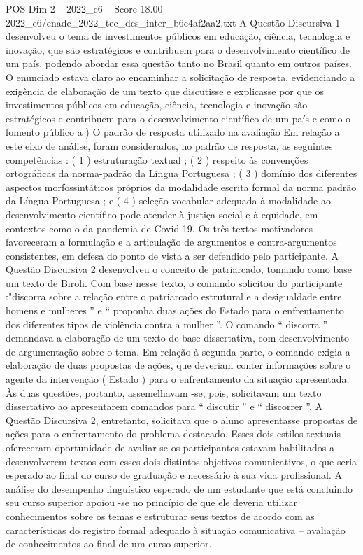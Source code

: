 \begin{textsample}{POS Dim 2 – 2022\_c6 – Score 18.00 – 2022\_c6/enade\_2022\_tec\_des\_inter\_b6c4af2aa2.txt}
A Questão Discursiva 1 desenvolveu o tema de investimentos públicos em educação, ciência, tecnologia e inovação, que são estratégicos e contribuem para o desenvolvimento científico de um país, podendo abordar essa questão tanto no Brasil quanto em outros países.
O enunciado estava claro ao encaminhar a solicitação de resposta, evidenciando a exigência de elaboração de um texto que discutisse e explicasse por que os investimentos públicos em educação, ciência, tecnologia e inovação são estratégicos e contribuem para o desenvolvimento científico de um país e como o fomento público a ) O padrão de resposta utilizado na avaliação Em relação a este eixo de análise, foram considerados, no padrão de resposta, as seguintes competências : ( 1 ) estruturação textual ; ( 2 ) respeito às convenções ortográficas da norma-padrão da Língua Portuguesa ; ( 3 ) domínio dos diferentes aspectos morfossintáticos próprios da modalidade escrita formal da norma padrão da Língua Portuguesa ; e ( 4 ) seleção vocabular adequada à modalidade ao desenvolvimento científico pode atender à justiça social e à equidade, em contextos como o da pandemia de Covid-19.
Os três textos motivadores favoreceram a formulação e a articulação de argumentos e contra-argumentos consistentes, em defesa do ponto de vista a ser defendido pelo participante.
A Questão Discursiva 2 desenvolveu o conceito de patriarcado, tomando como base um texto de Biroli.
Com base nesse texto, o comando solicitou do participante :"discorra sobre a relação entre o patriarcado estrutural e a desigualdade entre homens e mulheres ” e “ proponha duas ações do Estado para o enfrentamento dos diferentes tipos de violência contra a mulher ”.
O comando “ discorra ” demandava a elaboração de um texto de base dissertativa, com desenvolvimento de argumentação sobre o tema.
Em relação à segunda parte, o comando exigia a elaboração de duas propostas de ações, que deveriam conter informações sobre o agente da intervenção ( Estado ) para o enfrentamento da situação apresentada.
Às duas questões, portanto, assemelhavam -se, pois, solicitavam um texto dissertativo ao apresentarem comandos para “ discutir ” e “ discorrer ”.
A Questão Discursiva 2, entretanto, solicitava que o aluno apresentasse propostas de ações para o enfrentamento do problema destacado.
Esses dois estilos textuais ofereceram oportunidade de avaliar se os participantes estavam habilitados a desenvolverem textos com esses dois distintos objetivos comunicativos, o que seria esperado ao final do curso de graduação e necessário à sua vida profissional.
A análise do desempenho linguístico esperado de um estudante que está concluindo seu curso superior apoiou -se no princípio de que ele deveria utilizar conhecimentos sobre os temas e estruturar seus textos de acordo com as características do registro formal adequado à situação comunicativa – avaliação de conhecimentos ao final de um curso superior.

\end{textsample}
